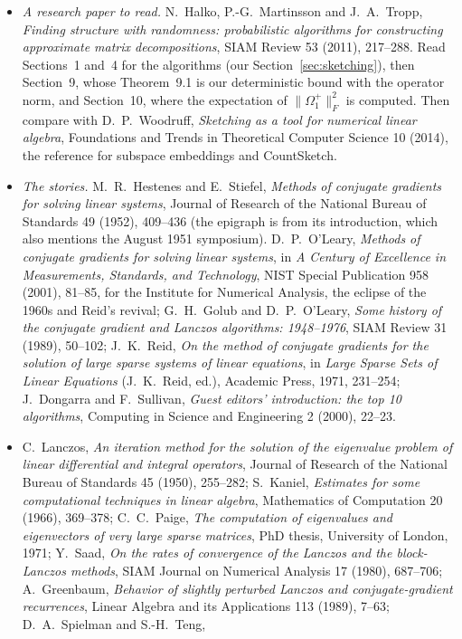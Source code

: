 \begin{itemize}
\item \emph{A research paper to read.} N.~Halko, P.-G.~Martinsson and J.~A.~Tropp, \emph{Finding structure with randomness: probabilistic algorithms for constructing approximate matrix decompositions},
SIAM Review 53 (2011), 217--288. Read Sections~1 and~4 for the algorithms (our Section~\ref{sec:sketching}), then Section~9, whose Theorem~9.1 is our deterministic bound with the operator norm,
and Section~10, where the expectation of $\|\Omega_1^+\|_F^2$ is computed. Then compare with D.~P.~Woodruff, \emph{Sketching as a tool for numerical linear algebra}, Foundations and Trends in Theoretical
Computer Science 10 (2014), the reference for subspace embeddings and CountSketch.
\item \emph{The stories.} M.~R.~Hestenes and E.~Stiefel, \emph{Methods of conjugate gradients for solving linear systems}, Journal of Research of the National Bureau of Standards 49 (1952), 409--436 (the
epigraph is from its introduction, which also mentions the August 1951 symposium). D.~P.~O'Leary, \emph{Methods of conjugate gradients for solving linear systems}, in \emph{A Century of Excellence in
Measurements, Standards, and Technology}, NIST Special Publication 958 (2001), 81--85, for the Institute for Numerical Analysis, the eclipse of the 1960s and Reid's revival; G.~H.~Golub and
D.~P.~O'Leary, \emph{Some history of the conjugate gradient and Lanczos algorithms: 1948--1976}, SIAM Review 31 (1989), 50--102; J.~K.~Reid, \emph{On the method of conjugate gradients for the solution of
large sparse systems of linear equations}, in \emph{Large Sparse Sets of Linear Equations} (J.~K.~Reid, ed.), Academic Press, 1971, 231--254; J.~Dongarra and F.~Sullivan, \emph{Guest editors' introduction:
the top 10 algorithms}, Computing in Science and Engineering 2 (2000), 22--23.
\item C.~Lanczos, \emph{An iteration method for the solution of the eigenvalue problem of linear differential and integral operators}, Journal of Research of the National Bureau of Standards 45 (1950),
255--282; S.~Kaniel, \emph{Estimates for some computational techniques in linear algebra}, Mathematics of Computation 20 (1966), 369--378; C.~C.~Paige, \emph{The computation of eigenvalues and eigenvectors of
very large sparse matrices}, PhD thesis, University of London, 1971; Y.~Saad, \emph{On the rates of convergence of the Lanczos and the block-Lanczos methods}, SIAM Journal on Numerical Analysis 17 (1980),
687--706; A.~Greenbaum, \emph{Behavior of slightly perturbed Lanczos and conjugate-gradient recurrences}, Linear Algebra and its Applications 113 (1989), 7--63; D.~A.~Spielman and S.-H.~Teng,

\end{itemize}
